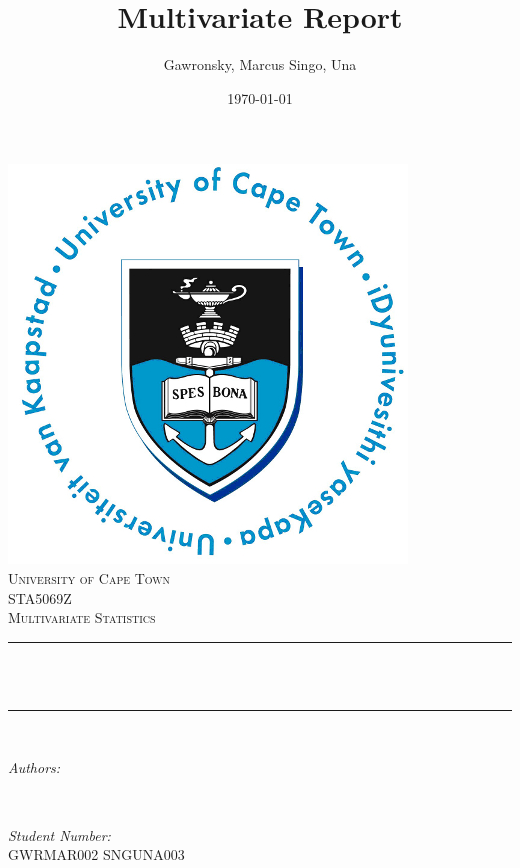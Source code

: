 \documentclass[12pt]{article}
\title{Multivariate Report}								%
\author{Gawronsky, Marcus \newline Singo, Una}
\date{\today}											%
\makeatletter
\let\thetitle\@title
\let\theauthor\@author
\let\thedate\@date
\makeatother
\begin{document}

\begin{titlepage}
	\centering
    \vspace*{0.5 cm}
    \includegraphics[scale = 0.75]{UCT.jpg}\\[1.0 cm]	%
    \textsc{\LARGE University of Cape Town}\\[2.0 cm]	%
	\textsc{\Large STA5069Z}\\[0.5 cm]				%
	\textsc{\large Multivariate Statistics}\\[0.5 cm]				%
	\rule{\linewidth}{0.2 mm} \\[0.4 cm]
	{ \huge \bfseries \thetitle}\\
	\rule{\linewidth}{0.2 mm} \\[1.5 cm]
	
	\begin{minipage}{0.4\textwidth}
		\begin{flushleft} \large
			\emph{Authors:}\\
			\theauthor
			\end{flushleft}
			\end{minipage}~
			\begin{minipage}{0.4\textwidth}
			\begin{flushright} \large
			\emph{Student Number:} \\
            GWRMAR002 SNGUNA003									%
            
		\end{flushright}
	\end{minipage}\\[2 cm]
	
	{\large \thedate}\\[2 cm]
 
	\vfill
	
\end{titlepage}
\end{document}
